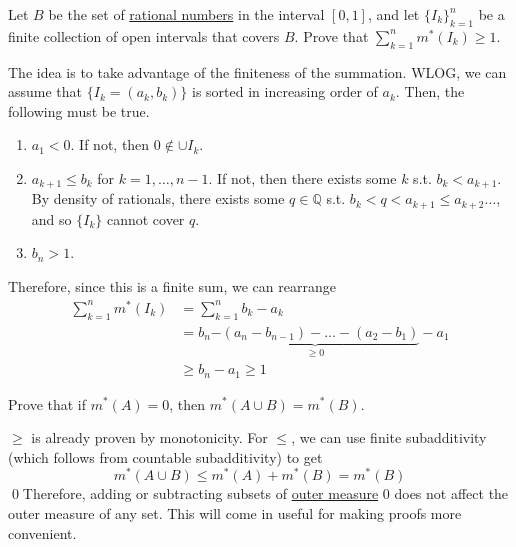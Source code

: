   \begin{exercise}[Royden 2.8]
    Let $B$ be the set of \hyperref[alg-def:rational-numbers]{rational numbers} in the interval $[0, 1]$, and let $\{I_k\}_{k=1}^{n}$ be a finite collection of open intervals that covers $B$. Prove that $\sum_{k=1}^{n} m^{\ast}(I_k) \geq 1$.
  \end{exercise}
  \begin{solution}
    The idea is to take advantage of the finiteness of the summation. WLOG, we can assume that $\{I_k = (a_k, b_k)\}$ is sorted in increasing order of $a_k$. Then, the following must be true. 
    \begin{enumerate}
      \item $a_1 < 0$. If not, then $0 \not\in \cup I_k$.  
      \item $a_{k+1} \leq b_k$ for $k = 1, \ldots, n-1$. If not, then there exists some $k$ s.t. $b_k < a_{k+1}$. By density of rationals, there exists some $q \in \mathbb{Q}$ s.t. $b_k < q < a_{k+1} \leq a_{k+2} \ldots$, and so $\{I_k\}$ cannot cover $q$.  
      \item $b_n > 1$. 
    \end{enumerate}
    Therefore, since this is a finite sum, we can rearrange 
    \begin{align}
      \sum_{k=1}^n m^\ast (I_k) & = \sum_{k=1}^n b_k - a_k \\ 
                                & = b_n \underbrace{- (a_n - b_{n-1}) - \ldots - (a_2 - b_1)}_{\geq 0} - a_1 \\ 
                                & \geq b_n - a_1 \geq 1
    \end{align}
  \end{solution}

  \begin{exercise}[Royden 2.9]
    Prove that if $m^{\ast}(A) = 0$, then $m^{\ast}(A \cup B) = m^{\ast}(B)$.
  \end{exercise}
  \begin{solution}
    $\geq$ is already proven by monotonicity. For $\leq$, we can use finite subadditivity (which follows from countable subadditivity) to get 
    \begin{equation}
      m^\ast (A \cup B) \leq m^\ast(A) + m^\ast (B) = m^\ast (B) 
    \end{equation}
    \qed Therefore, adding or subtracting subsets of \hyperref[def:outer-measure]{outer measure} $0$ does not affect the outer measure of any set. This will come in useful for making proofs more convenient. 
  \end{solution}

